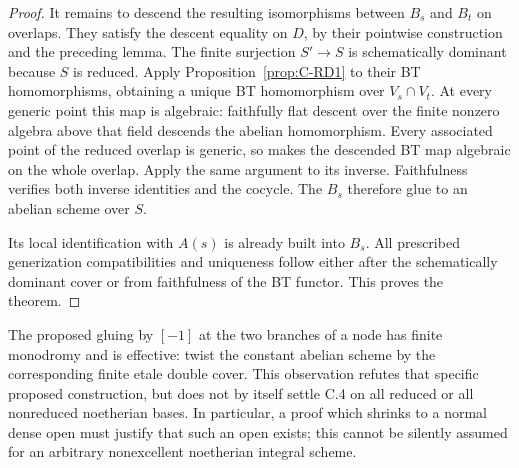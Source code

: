 \begin{proof}
It remains to descend the resulting isomorphisms between $B_s$ and
$B_t$ on overlaps. They satisfy the descent equality on $D$, by their
pointwise construction and the preceding lemma. The finite surjection
$S'\to S$ is schematically dominant because $S$ is reduced. Apply
Proposition~\ref{prop:C-RD1} to their BT homomorphisms, obtaining a
unique BT homomorphism over $V_s\cap V_t$. At every generic point
this map is algebraic: faithfully flat descent over the finite
nonzero algebra above that field descends the abelian homomorphism.
Every associated point of the reduced overlap is generic, so
\cite[Proposition~1.2, p.64]{Grothendieck1966Hom} makes the descended
BT map algebraic on the whole overlap. Apply the same argument to its
inverse. Faithfulness verifies both inverse identities and the
cocycle. The $B_s$ therefore glue to an abelian scheme over $S$.

Its local identification with $A(s)$ is already built into $B_s$.
All prescribed generization compatibilities and uniqueness follow
either after the schematically dominant cover or from faithfulness
of the BT functor. This proves the theorem.
\end{proof}

\begin{remark}
The proposed gluing by $[-1]$ at the two branches of a node has finite
monodromy and is effective: twist the constant abelian scheme by the
corresponding finite etale double cover. This observation refutes that
specific proposed construction, but does not by itself settle C.4 on
all reduced or all nonreduced noetherian bases. In particular, a proof
which shrinks to a normal dense open must justify that such an open
exists; this cannot be silently assumed for an arbitrary nonexcellent
noetherian integral scheme.
\end{remark}
